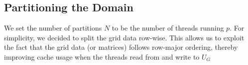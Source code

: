 \documentclass{article}
\begin{document}









\subsection{Partitioning the Domain}
We set the number of partitions $N$ to be the number of threads running $p$. For simplicity, we decided to split
the grid data row-wise. This allows us to exploit the fact that the grid data (or matrices) follows row-major ordering, thereby improving cache usage when the threads read from and write to $U_G$



\end{document}

